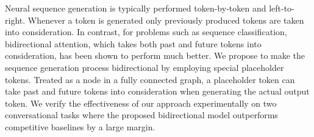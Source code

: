 Neural sequence generation is typically performed token-by-token and left-to-right. Whenever a token is generated only previously produced tokens are taken into consideration. In contrast, for problems such as sequence classification, bidirectional attention, which takes both past and future tokens into consideration, has been shown to perform much better. We propose to make the sequence generation process bidirectional by employing special placeholder tokens. Treated as a node in a fully connected graph, a placeholder token can take past and future tokens into consideration when generating the actual output token. We verify the effectiveness of our approach experimentally on two conversational  tasks  where the proposed bidirectional model outperforms competitive baselines by a large margin.